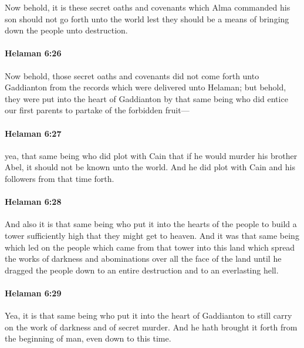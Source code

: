 			Now behold, it is these secret oaths and covenants
			which Alma commanded his son should not go forth unto the world
			lest they should be a means of bringing down the people unto destruction.

		\paragraph{Helaman 6:26} %
			\label{HELAMAN-6-26}

			Now behold, those secret oaths and covenants did not come forth unto Gaddianton
			from the records which were delivered unto Helaman;
			but behold, they were put into the heart of Gaddianton
			by that same being who did entice our first parents
			to partake of the forbidden fruit---

		\paragraph{Helaman 6:27} %
			\label{HELAMAN-6-27}

			yea, that same being who did plot with Cain
			that if he would murder his brother Abel,
			it should not be known unto the world.
			And he did plot with Cain and his followers from that time forth.

		\paragraph{Helaman 6:28} %
			\label{HELAMAN-6-28}

			And also it is that same being who put it into the hearts of the people
			to build a tower sufficiently high that they might get to heaven.
			And it was that same being
			which led on the people which came from that tower into this land
			which spread the works of darkness and abominations
			over all the face of the land
			until he dragged the people down
			to an entire destruction and to an everlasting hell.

		\paragraph{Helaman 6:29} %
			\label{HELAMAN-6-29}

			Yea, it is that same being who put it into the heart of Gaddianton
			to still carry on the work of darkness and of secret murder.
			And he hath brought it forth from the beginning of man,
			even down to this time.

